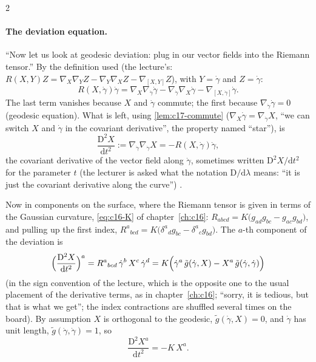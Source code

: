 \begin{paracol}{2}
\paragraph{The deviation equation.} ``Now let us look at geodesic deviation: plug in our vector fields into the Riemann tensor.'' By the definition used (the lecture's: $R(X,Y)Z=\nabla_X\nabla_YZ-\nabla_Y\nabla_XZ-\nabla_{[X,Y]}Z$), with $Y=\dot\gamma$ and $Z=\dot\gamma$:
\[
  R(X,\dot\gamma)\dot\gamma=\nabla_X\nabla_{\dot\gamma}\dot\gamma-\nabla_{\dot\gamma}\nabla_X\dot\gamma-\nabla_{[X,\dot\gamma]}\dot\gamma.
\]
The last term vanishes because $X$ and $\dot\gamma$ commute; the first because $\nabla_{\dot\gamma}\dot\gamma=0$ (geodesic equation). What is left, using \cref{lem:c17-commute} ($\nabla_X\dot\gamma=\nabla_{\dot\gamma}X$, ``we can switch $X$ and $\dot\gamma$ in the covariant derivative'', the property named ``star''), is
\[
  \frac{\mathrm D^2X}{\mathrm dt^2}:=\nabla_{\dot\gamma}\nabla_{\dot\gamma}X=-R(X,\dot\gamma)\dot\gamma,
\]
the covariant derivative of the vector field along $\dot\gamma$, sometimes written $\mathrm D^2X/\mathrm dt^2$ for the parameter $t$ (the lecturer is asked what the notation $\mathrm D/\mathrm d\lambda$ means: ``it is just the covariant derivative along the curve'') .

Now in components on the surface, where the Riemann tensor is given in terms of the Gaussian curvature, \eqref{eq:c16-K} of chapter~\ref{ch:c16}: $R_{abcd}=K\bigl(g_{ad}g_{bc}-g_{ac}g_{bd}\bigr)$, and pulling up the first index, $R^a{}_{bcd}=K\bigl(\delta^a{}_dg_{bc}-\delta^a{}_cg_{bd}\bigr)$. The $a$-th component of the deviation is
\[
  \Bigl(\frac{\mathrm D^2X}{\mathrm dt^2}\Bigr)^a=R^a{}_{bcd}\,\dot\gamma^b\,X^c\,\dot\gamma^d
  =K\Bigl(\dot\gamma^a\,\tilde g(\dot\gamma,X)-X^a\,\tilde g(\dot\gamma,\dot\gamma)\Bigr)
\]
(in the sign convention of the lecture, which is the opposite one to the usual placement of the derivative terms, as in chapter~\ref{ch:c16}; ``sorry, it is tedious, but that is what we get''; the index contractions are shuffled several times on the board). By assumption $X$ is orthogonal to the geodesic, $\tilde g(\dot\gamma,X)=0$, and $\dot\gamma$ has unit length, $\tilde g(\dot\gamma,\dot\gamma)=1$, so
\begin{equation}\label{eq:c17-deviation}
  \frac{\mathrm D^2X^a}{\mathrm dt^2}=-K\,X^a.
\end{equation}


\end{paracol}
